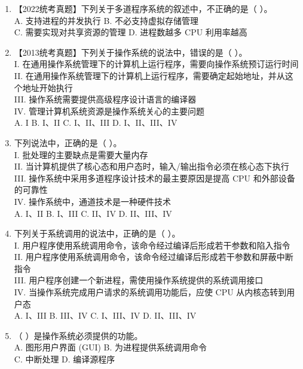 \documentclass[lang=cn,newtx,10pt,scheme=chinese]{../../elegantbook}
\begin{document}
\begin{enumerate}
  \item 【2022统考真题】下列关于多道程序系统的叙述中，不正确的是（ ）。\\
  A. 支持进程的并发执行 \quad B. 不必支持虚拟存储管理\\
  C. 需要实现对共享资源的管理 \quad D. 进程数越多 CPU 利用率越高

  \item 【2013统考真题】下列关于操作系统的说法中，错误的是（ ）。\\
  I. 在通用操作系统管理下的计算机上运行程序，需要向操作系统预订运行时间\\
  II. 在通用操作系统管理下的计算机上运行程序，需要确定起始地址，并从这个地址开始执行\\
  III. 操作系统需要提供高级程序设计语言的编译器\\
  IV. 管理计算机系统资源是操作系统关心的主要问题\\
  A. I \quad B. I、II \quad C. I、II、III \quad D. I、II、III、IV

  \item 下列说法中，正确的是（ ）。\\
  I. 批处理的主要缺点是需要大量内存\\
  II. 当计算机提供了核心态和用户态时，输入/输出指令必须在核心态下执行\\
  III. 操作系统中采用多道程序设计技术的最主要原因是提高 CPU 和外部设备的可靠性\\
  IV. 操作系统中，通道技术是一种硬件技术\\
  A. I、II \quad B. I、III \quad C. II、IV \quad D. II、III、IV

  \item 下列关于系统调用的说法中，正确的是（ ）。\\
  I. 用户程序使用系统调用命令，该命令经过编译后形成若干参数和陷入指令\\
  II. 用户程序使用系统调用命令，该命令经过编译后形成若干参数和屏蔽中断指令\\
  III. 用户程序创建一个新进程，需使用操作系统提供的系统调用接口\\
  IV. 当操作系统完成用户请求的系统调用功能后，应使 CPU 从内核态转到用户态\\
  A. I、III \quad B. III、IV \quad C. I、III、IV \quad D. II、III、IV

  \item （ ）是操作系统必须提供的功能。\\
  A. 图形用户界面 (GUI) \quad B. 为进程提供系统调用命令\\
  C. 中断处理 \quad D. 编译源程序


\end{enumerate}
\end{document}
